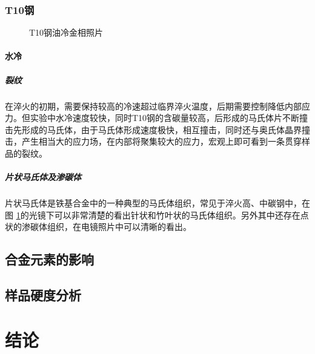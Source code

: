 \documentclass[12pt]{ctexart}
\begin{document}
\subsubsection{T10钢}
\begin{figure}[h]
\centering
{}
\caption{T10钢油冷金相照片}
\label{10water}
\end{figure}
\paragraph{水冷}
\subparagraph{裂纹}
在淬火的初期，需要保持较高的冷速超过临界淬火温度，后期需要控制降低内部应力。但实验中水冷速度较快，同时T10钢的含碳量较高，后形成的马氏体片不断撞击先形成的马氏体，由于马氏体形成速度极快，相互撞击，同时还与奥氏体晶界撞击，产生相当大的应力场，在内部将聚集较大的应力，宏观上即可看到一条贯穿样品的裂纹。
\subparagraph{片状马氏体及渗碳体}
片状马氏体是铁基合金中的一种典型的马氏体组织，常见于淬火高、中碳钢中，在图 \ref{10water}的光镜下可以非常清楚的看出针状和竹叶状的马氏体组织。另外其中还存在点状的渗碳体组织，在电镜照片中可以清晰的看出。
\subsection{合金元素的影响}
\subsection{样品硬度分析}
\section{结论}
\end{document}
